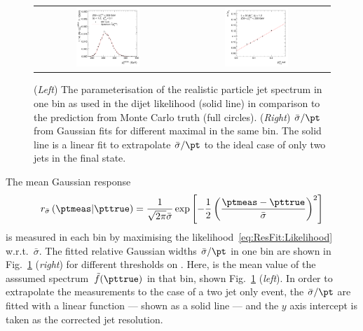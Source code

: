 \begin{figure}[ht]
  \centering
  \begin{tabular}{cc}
    \includegraphics[width=0.45\textwidth]{figures/ResFit_Spring10QCDFlat_Gauss_Eta0_Spectrum_PtBin6} &
    \includegraphics[width=0.45\textwidth]{figures/ResFit_Spring10QCDFlat_Gauss_Eta0_ExtrapolatedPar0_PtBin6}
  \end{tabular}
\caption{(\textit{Left}) The parameterisation of the realistic particle jet \pt spectrum in one \pt bin as used in the dijet likelihood (solid line) in comparison to the prediction from Monte Carlo truth (full circles). 
  (\textit{Right}) $\bar{\sigma}/\pt$ from Gaussian fits for different maximal \ptrel in the same \pt bin.
  The solid line is a linear fit to extrapolate $\bar{\sigma}/\pt$ to the ideal case of only two jets in the
  final state.}
\label{fig:ResFit:QCDMC:Extrapolation:Gauss:ExBin:SpectrumAndExtrapolation}
\end{figure}

The mean Gaussian response
\begin{equation*}
  r_{\bar{\sigma}}\left(\ptmeas|\pttrue\right) = 
  \frac{1}{\sqrt{2\pi}\bar{\sigma}}\exp\left[-\frac{1}{2}\left(\frac{\ptmeas - \pttrue}{\bar{\sigma}}\right)^{2}\right]
\end{equation*}
is measured in each bin by maximising the likelihood~\eqref{eq:ResFit:Likelihood} w.r.t.~$\bar{\sigma}$.
The fitted relative Gaussian widths $\bar{\sigma}/\pt$ in one \pt bin are shown in Fig.~\ref{fig:ResFit:QCDMC:Extrapolation:Gauss:ExBin:SpectrumAndExtrapolation} (\textit{right}) for different thresholds on \ptrel.
Here, \pt is the mean value of the asssumed spectrum~$\tilde{f}(\pttrue)$ in that bin, shown Fig.~\ref{fig:ResFit:QCDMC:Extrapolation:Gauss:ExBin:SpectrumAndExtrapolation} (\textit{left}).
In order to extrapolate the measurements to the case of a two jet only event, the $\bar{\sigma}/\pt$ are fitted with a linear function --- shown as a solid line --- and the $y$ axis intercept is taken as the corrected jet \pt resolution.

